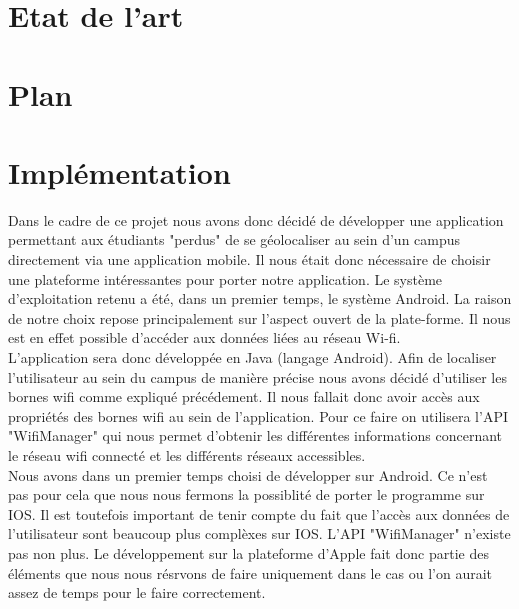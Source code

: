 \documentclass[11pt,a4paper]{article}
\begin{document}
\newpage
\section{Etat de l'art}

\section{Plan}

\section{Implémentation}
Dans le cadre de ce projet nous avons donc décidé de développer une application permettant aux étudiants "perdus" de se géolocaliser au sein d'un campus directement via une application mobile. Il nous était donc nécessaire de choisir une plateforme intéressantes pour porter notre application. Le système d'exploitation retenu a été, dans un premier temps, le système Android. La raison de notre choix repose principalement sur l'aspect \og ouvert \fg{} de la plate-forme. Il nous est en effet possible d'accéder aux données liées au réseau Wi-fi.\\
L'application sera donc développée en Java (langage Android). Afin de localiser l'utilisateur au sein du campus de manière précise nous avons décidé d'utiliser les bornes wifi comme expliqué précédement. Il nous fallait donc avoir accès aux propriétés des bornes wifi au sein de l'application. Pour ce faire on utilisera l'API "WifiManager" qui nous permet d'obtenir les différentes informations concernant le réseau wifi connecté et les différents réseaux accessibles.\\
Nous avons dans un premier temps choisi de développer sur Android. Ce n'est pas pour cela que nous nous fermons la possiblité de porter le programme sur IOS. Il est toutefois important de tenir compte du fait que l'accès aux données de l'utilisateur sont beaucoup plus complèxes sur IOS. L'API "WifiManager" n'existe pas non plus. Le développement sur la plateforme d'Apple fait donc partie des éléments que nous nous résrvons de faire uniquement dans le cas ou l'on aurait assez de temps pour le faire correctement.
\end{document}
